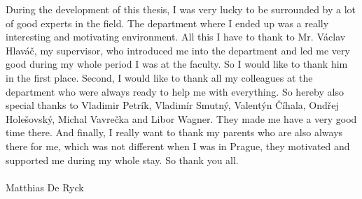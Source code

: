 During the development of this thesis, I was very lucky to be surrounded by a lot of good experts in the field. The department where I ended up was a really interesting and motivating environment. All this I have to thank to Mr. Václav Hlaváč, my supervisor, who introduced me into the department and led me very good during my whole period I was at the faculty. So I would like to thank him in the first place. Second, I would like to thank all my colleagues at the department who were always ready to help me with everything. So hereby also special thanks to Vladimir Petrík, Vladimír Smutný, Valentýn Číhala, Ondřej Holešovský, Michal Vavrečka and Libor Wagner. They made me have a very good time there. And finally, I really want to thank my parents who are also always there for me, which was not different when I was in Prague, they motivated and supported me during my whole stay. So thank you all.\\\\
Matthias De Ryck
